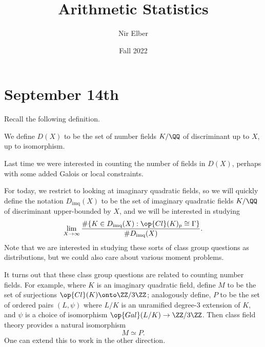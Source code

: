 \documentclass{article}
\title{Arithmetic Statistics}
\author{Nir Elber}
\date{Fall 2022}
\begin{document}
\maketitle

\tableofcontents

\section{September 14th}
Recall the following definition.
\begin{definition}
	We define $D(X)$ to be the set of number fields $K/\QQ$ of discriminant up to $X$, up to isomorphism.
\end{definition}
Last time we were interested in counting the number of fields in $D(X)$, perhaps with some added Galois or local constraints.

For today, we restrict to looking at imaginary quadratic fields, so we will quickly define the notation $D_{\textrm{imq}}(X)$ to be the set of imaginary quadratic fields $K/\QQ$ of discriminant upper-bounded by $X$, and we will be interested in studying
\[\lim_{X\to\infty}\frac{\#\{K\in D_{\textrm{imq}}(X):\op{Cl}(K)_p\cong\Gamma\}}{\#D_{\textrm{imq}}(X)}.\]
Note that we are interested in studying these sorts of class group questions as distributions, but we could also care about various moment problems.

It turns out that these class group questions are related to counting number fields. For example, where $K$ is an imaginary quadratic field, define $M$ to be the set of surjections $\op{Cl}(K)\onto\ZZ/3\ZZ$; analogously define, $P$ to be the set of ordered pairs $(L,\psi)$ where $L/K$ is an unramified degree-$3$ extension of $K$, and $\psi$ is a choice of isomorphism $\op{Gal}(L/K)\to\ZZ/3\ZZ$. Then class field theory provides a natural isomorphism
\[M\simeq P.\]
One can extend this to work in the other direction.
\end{document}
